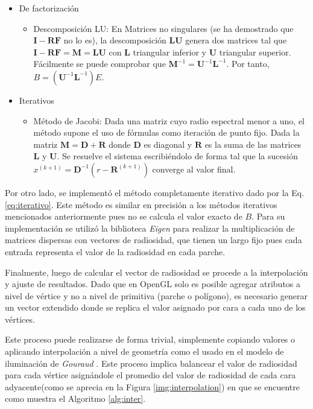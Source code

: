 \begin{itemize}
	\item{De factorización}
		\begin{itemize}
			\item{Descomposición LU:} En Matrices no singulares (se ha demostrado que $\mathbf{I - RF}$ no lo es), la descomposición $\mathbf{LU}$ genera dos matrices tal que $\mathbf{I - RF} = \mathbf{M} = \mathbf{LU}$ con $\mathbf{L}$ triangular inferior y $\mathbf{U}$ triangular superior. Fácilmente se puede comprobar que  $\mathbf{M}^{-1} = \mathbf{U}^{-1} \mathbf{L}^{-1}$. Por tanto, $B =(\mathbf{U}^{-1} \mathbf{L}^{-1})E$. 
			\end{itemize}
	\item{Iterativos}
			\begin{itemize}
			\item Método de Jacobi:
				Dada una matriz cuyo radio espectral menor a uno, el método supone el uso de fórmulas como iteración de punto fijo. Dada la matriz $\mathbf{M} = \mathbf{D} + \mathbf{R}$ donde $\mathbf{D}$ es diagonal y $\mathbf{R}$ es la suma de las matrices $\mathbf{L}$ y $\mathbf{U}$. Se resuelve el sistema escribiéndolo de forma tal que la sucesión $x^{(k+1)} = \mathbf{D}^{-1}(r - \mathbf{R}^{(k+1)})$ converge al valor final.
		\end{itemize}
\end{itemize}

Por otro lado, se implementó el método completamente iterativo dado por la Eq. \eqref{eq:iterativo}. Este método es similar en precisión a los métodos iterativos  mencionados anteriormente pues no se calcula el valor exacto de $B$. Para su implementación se utilizó la biblioteca \textit{Eigen} para realizar la multiplicación de matrices dispersas con vectores de radiosidad, que tienen un largo fijo pues cada entrada representa el valor de la radiosidad en cada parche.

Finalmente, luego de calcular el vector de radiosidad se procede a la interpolación y ajuste de resultados. Dado que en OpenGL solo es posible agregar atributos a nivel de vértice y no a nivel de primitiva (parche o polígono), es necesario generar un vector extendido donde se replica el valor asignado por cara a cada uno de los vértices.

Este proceso puede realizarse de forma trivial, simplemente copiando valores o aplicando interpolación a nivel de geometría como el usado en el modelo de iluminación de \textit{Gouraud} \cite{Gouraud}. Este proceso implica balancear el valor de radiosidad para cada vértice asignándole el promedio del valor de radiosidad de cada cara adyacente(como se aprecia en la Figura \ref{img:interpolation}) en que se encuentre como muestra el Algoritmo \ref{alg:inter}.

